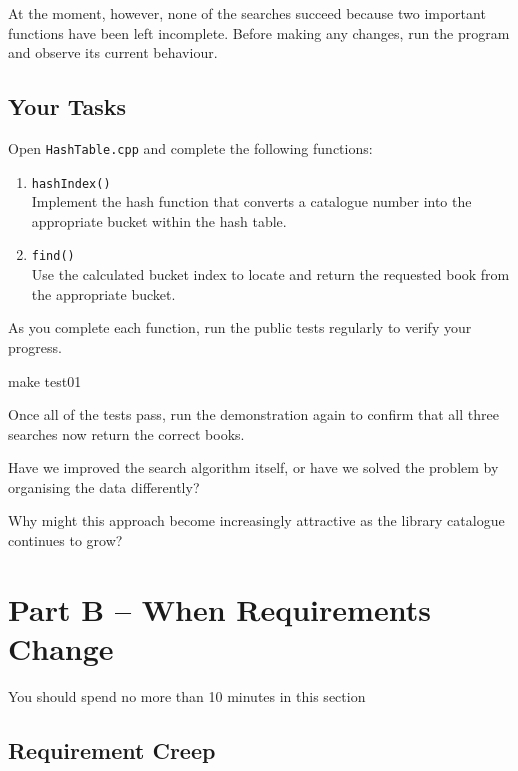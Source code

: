 \documentclass{csc2059practical}
\begin{document}
At the moment, however, none of the searches succeed because two important functions have been left incomplete. Before making any changes, run the program and observe its current behaviour.

\subsection*{Your Tasks}

Open \texttt{HashTable.cpp} and complete the following functions:

\begin{enumerate}
    \item \texttt{hashIndex()}\\
    Implement the hash function that converts a catalogue number into the appropriate bucket within the hash table.

    \item \texttt{find()}\\
    Use the calculated bucket index to locate and return the requested book from the appropriate bucket.
\end{enumerate}

As you complete each function, run the public tests regularly to verify your progress.

\begin{terminal}
make test01
\end{terminal}

Once all of the tests pass, run the demonstration again to confirm that all three searches now return the correct books.

\clearpage

\begin{reflectionbox}
Have we improved the search algorithm itself, or have we solved the problem by organising the data differently?

Why might this approach become increasingly attractive as the library catalogue continues to grow?
\end{reflectionbox}

\section{Part B -- When Requirements Change}
\begin{infobox}
    You should spend no more than 10 minutes in this section
\end{infobox}

\subsection{Requirement Creep}
\end{document}

